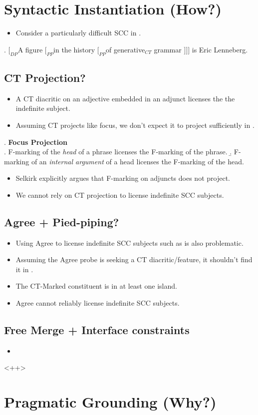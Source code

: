 \documentclass[letterpaper]{article}
\begin{document}
\section{Syntactic Instantiation (How?)}
\begin{itemize}
  \item Consider a particularly difficult SCC in \Next.
\end{itemize}
\ex. $[_{DP}$A figure $[_{PP}$in the history $[_{PP}$of generative$_{CT}$ grammar $]]]$ is Eric Lenneberg.

\subsection{CT Projection?}
\begin{itemize}
  \item A CT diacritic on an adjective embedded in an adjunct licenses the the indefinite subject.
  \item Assuming CT projects like focus, we don't expect it to project sufficiently in \Last.
\end{itemize}
\ex. \textbf{Focus Projection} \parencite{selkirk1996sentence}\\
\a. F-marking of the \textit{head} of a phrase licenses the F-marking of the phrase.
\b. F-marking of an \textit{internal argument} of a head licenses the F-marking of the head.

\begin{itemize}
  \item Selkirk explicitly argues that F-marking on adjuncts does not project.
  \item We cannot rely on CT projection to license indefinite SCC subjects.
\end{itemize}
\subsection{Agree + Pied-piping?}
\begin{itemize}
  \item Using Agree to license indefinite SCC subjects such as \LLast is also problematic.
  \item Assuming the Agree probe is seeking a CT diacritic/feature, it shouldn't find it in \LLast.
  \item The CT-Marked constituent is in at least one island.
  \item Agree cannot reliably license indefinite SCC subjects.
\end{itemize}
\subsection{Free Merge + Interface constraints}
\begin{itemize}
  \item 
\end{itemize}<++>
\section{Pragmatic Grounding (Why?)}
\end{document}
